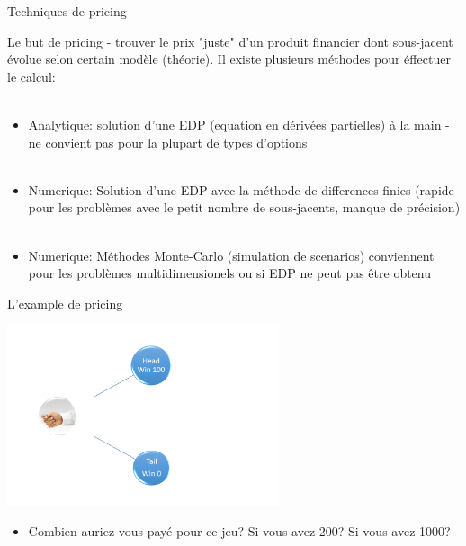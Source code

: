 \documentclass[10pt]{beamer}
\begin{document}
\begin{frame}{Techniques de pricing}{}
\begin{block}{}

    Le but de pricing - trouver le prix "juste" d'un produit financier dont sous-jacent évolue selon certain modèle (théorie). Il existe plusieurs méthodes pour éffectuer le calcul: \\~\\
  \begin{itemize}
    \item Analytique: solution d'une EDP (equation en dérivées partielles) à la main - ne convient pas pour la plupart de types d'options \\~\\
    
    \item Numerique: Solution d'une EDP avec la méthode de differences finies (rapide pour les problèmes avec le petit nombre de sous-jacents, manque de précision)  \\~\\
    
    \item Numerique: Méthodes Monte-Carlo (simulation de scenarios) conviennent pour les problèmes multidimensionels ou si EDP ne peut pas être obtenu
    
  \end{itemize}
\end{block}
\end{frame}

\begin{frame}{L'example de pricing}{}
\begin{block}{}
    
   \includegraphics[width=8cm]{AAUgraphics/example1.png}
   
   \begin{itemize}
        \item Combien auriez-vous payé pour ce jeu? Si vous avez 200? Si vous avez 1000?
   \end{itemize}
    
\end{block}
\end{frame}
\end{document}
